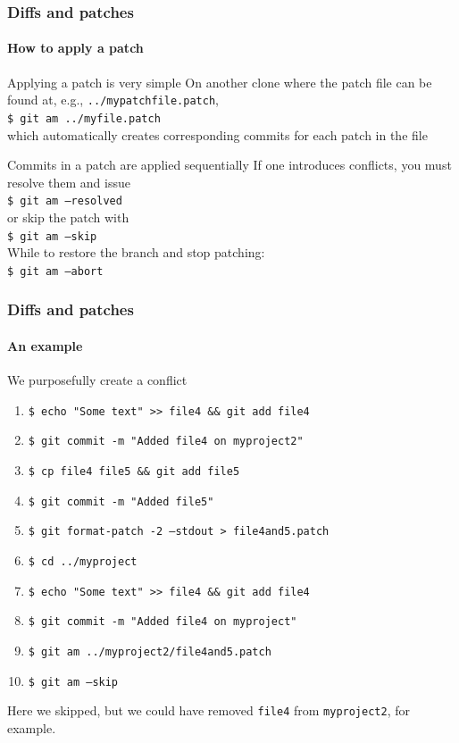 \begin{frame}
\frametitle{Diffs and patches}
\framesubtitle{How to apply a patch}

\begin{block}{Applying a patch is very simple}
On another clone where the patch file can be found at, e.g., \texttt{../mypatchfile.patch}, \\
\texttt{\$ git am ../myfile.patch} \\
which automatically creates corresponding commits for each patch in the file
\end{block}
\pause
\begin{block}{Commits in a patch are applied sequentially}
If one introduces conflicts, you must resolve them and issue \\
\texttt{\$ git am ---resolved} \\
or skip the patch with \\
\texttt{\$ git am ---skip} \\
While to restore the branch and stop patching: \\
\texttt{\$ git am ---abort}
\end{block}

\end{frame}

\begin{frame}
\frametitle{Diffs and patches}
\framesubtitle{An example}

\begin{block}{We purposefully create a conflict}
\begin{enumerate}
\item \texttt{\$ echo "Some text"  >\;\!\!> file4 \&\& git add file4} \\
\item \texttt{\$ git commit -m "Added file4 on myproject2"} \\
\item \texttt{\$ cp file4 file5 \&\& git add file5} \\
\item \texttt{\$ git commit -m "Added file5"} \\
\item \texttt{\$ git format-patch -2 ---stdout > file4and5.patch} \\
\item \texttt{\$ cd ../myproject} \\
\item \texttt{\$ echo "Some text"  >\;\!\!> file4 \&\& git add file4} \\
\item \texttt{\$ git commit -m "Added file4 on myproject"} \\
\item \texttt{\$ git am ../myproject2/file4and5.patch} \\
\item \texttt{\$ git am ---skip}
\end{enumerate}
\medskip
\pause
Here we skipped, but we could have removed \texttt{file4} from \texttt{myproject2}, for example.
\end{block}
\end{frame}

